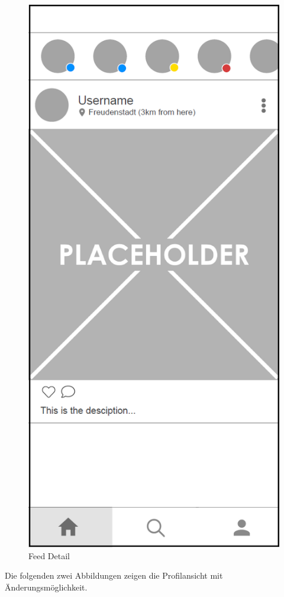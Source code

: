 \begin{figure}[H]
\begin{minipage}{.5\textwidth}
      \includegraphics[width=.6\linewidth]{images/Feed_Detail_MockUp.png}
      \caption{Feed Detail}
      \label{fig:feed_detail}
    \end{minipage}
\end{figure}

Die folgenden zwei Abbildungen zeigen die Profilansicht mit Änderungsmöglichkeit.

